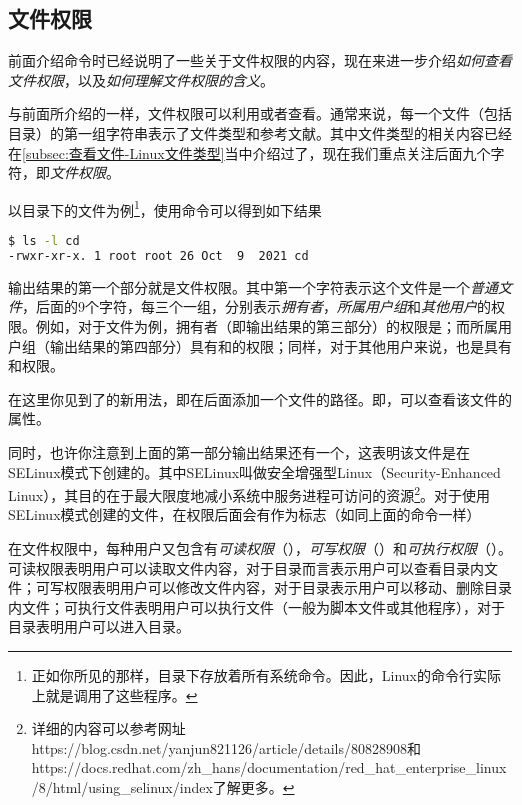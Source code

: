 \subsection{文件权限}\label{subsec:文件权限管理-文件权限}

前面介绍命令时已经说明了一些关于文件权限的内容，现在来进一步介绍\emph{如何查看文件权限}，以及\emph{如何理解文件权限的含义}。

与前面所介绍的一样，文件权限可以利用或者查看。通常来说，每一个文件（包括目录）的第一组字符串表示了文件类型和参考文献。其中文件类型的相关内容已经在\ref{subsec:查看文件-Linux文件类型}当中介绍过了，现在我们重点关注后面九个字符，即\emph{文件权限}。

以目录下的文件为例\footnote{正如你所见的那样，目录下存放着所有系统命令。因此，Linux的命令行实际上就是调用了这些程序。}，使用命令可以得到如下结果

\begin{lstlisting}[language=bash]
$ ls -l cd
-rwxr-xr-x. 1 root root 26 Oct  9  2021 cd
\end{lstlisting}

输出结果的第一个部分就是文件权限。其中第一个字符\code{-}表示这个文件是一个\emph{普通文件}，后面的9个字符，每三个一组，分别表示\emph{拥有者}，\emph{所属用户组}和\emph{其他用户}的权限。例如，对于文件为例，拥有者（即输出结果的第三部分）的权限是；而所属用户组（输出结果的第四部分）具有和的权限；同样，对于其他用户来说，也是具有和权限。

\begin{extend}
    在这里你见到了的新用法，即在后面添加一个文件的路径。即，可以查看该文件的属性。

    同时，也许你注意到上面的第一部分输出结果还有一个，这表明该文件是在SELinux模式下创建的。其中SELinux叫做安全增强型Linux（Security-Enhanced Linux），其目的在于最大限度地减小系统中服务进程可访问的资源\footnote{详细的内容可以参考网址https://blog.csdn.net/yanjun821126/article/details/80828908和https://docs.redhat.com/zh\_hans/documentation/red\_hat\_enterprise\_linux/8/html/using\_selinux/index了解更多。}。对于使用SELinux模式创建的文件，在权限后面会有作为标志（如同上面的命令一样）
\end{extend}

在文件权限中，每种用户又包含有\emph{可读权限}（），\emph{可写权限}（）和\emph{可执行权限}（）。可读权限表明用户可以读取文件内容，对于目录而言表示用户可以查看目录内文件；可写权限表明用户可以修改文件内容，对于目录表示用户可以移动、删除目录内文件；可执行文件表明用户可以执行文件（一般为脚本文件或其他程序），对于目录表明用户可以进入目录。

